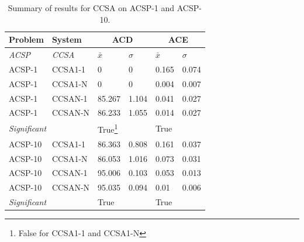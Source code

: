 \begin{table}[htp]
	\centering\small
		\begin{minipage}{0.50\textwidth}
			\centering
			\begin{tabular}{llllll}
			\toprule
			\textbf{Problem} & \textbf{System} & \multicolumn{2}{c}{\textbf{ACD}} & \multicolumn{2}{c}{\textbf{ACE}}\\
			\midrule
			\emph{ACSP} & \emph{CCSA} & $\bar{x}$ & $\sigma$ & $\bar{x}$ & $\sigma$\\
			\toprule
			ACSP-1 & CCSA1-1 & 0 & 0 & 0.165 & 0.074 \\
			ACSP-1 & CCSA1-N & 0 & 0 & 0.004 & 0.007 \\
			ACSP-1 & CCSAN-1 & 85.267 & 1.104 & 0.041 & 0.027 \\
			ACSP-1 & CCSAN-N & 86.233 & 1.055 & 0.014 & 0.027 \\
			\multicolumn{2}{l}{\emph{Significant}} & True\footnote{False for CCSA1-1 and CCSA1-N} &  & True & \\
			\midrule
			ACSP-10 & CCSA1-1 & 86.363 & 0.808 & 0.161 & 0.037 \\
			ACSP-10 & CCSA1-N & 86.053 & 1.016 & 0.073 & 0.031 \\
			ACSP-10 & CCSAN-1 & 95.006 & 0.103 & 0.053 & 0.013 \\
			ACSP-10 & CCSAN-N & 95.035 & 0.094 & 0.01 & 0.006 \\
			 \multicolumn{2}{l}{\emph{Significant}} & True &  & True & \\
			\bottomrule			
			\end{tabular}
		\end{minipage}
	\caption{Summary of results for CCSA on ACSP-1 and ACSP-10.}
	\label{tab:cells:ccsa:study}
\end{table}

